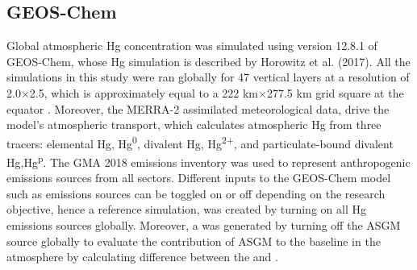 \subsection{GEOS-Chem}
\begin{flushleft}

Global atmospheric Hg concentration was simulated using version 12.8.1 of GEOS-Chem, whose Hg simulation is described by Horowitz et al. (2017)\cite{horowitz_new_2017}. All the simulations in this study were ran globally for 47 vertical layers at a resolution of 2.0$\times$2.5, which is approximately equal to a 222 km$\times$277.5 km grid square at the equator \cite{horowitz_new_2017}. Moreover, the MERRA-2 assimilated meteorological data,\cite{gelaro_modern-era_2017} drive the model's atmospheric transport, which calculates atmospheric Hg from three tracers: elemental Hg, Hg\textsuperscript{0}, divalent Hg, Hg\textsuperscript{2+}, and particulate-bound divalent Hg,Hg\textsuperscript{p}. The GMA 2018 emissions inventory was used to represent anthropogenic emissions sources from all sectors\cite{steenhuisen_development_2019}. Different inputs to the GEOS-Chem model such as emissions sources can be toggled on or off depending on the research objective, hence a reference simulation, \on was created by turning on all Hg emissions sources globally. Moreover, a \off was generated by turning off the ASGM source globally to evaluate the contribution of ASGM to the baseline \hg in the atmosphere by calculating difference between the \on and \off.
\end{flushleft}


